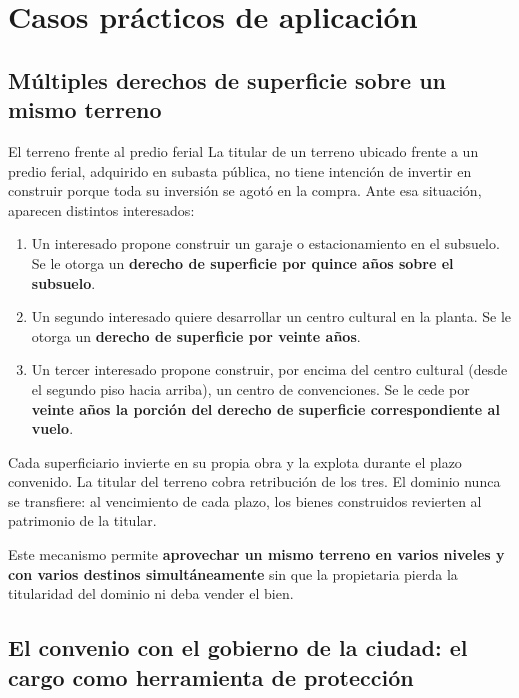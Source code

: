 \documentclass[12pt,oneside]{book}
\begin{document}
\chapter{Casos prácticos de aplicación}

\section{Múltiples derechos de superficie sobre un mismo terreno}

\begin{example}{El terreno frente al predio ferial}
La titular de un terreno ubicado frente a un predio ferial, adquirido en subasta pública, no tiene intención de invertir en construir porque toda su inversión se agotó en la compra. Ante esa situación, aparecen distintos interesados:

\begin{enumerate}
    \item Un interesado propone construir un garaje o estacionamiento en el subsuelo. Se le otorga un \textbf{derecho de superficie por quince años sobre el subsuelo}.
    \item Un segundo interesado quiere desarrollar un centro cultural en la planta. Se le otorga un \textbf{derecho de superficie por veinte años}.
    \item Un tercer interesado propone construir, por encima del centro cultural (desde el segundo piso hacia arriba), un centro de convenciones. Se le cede por \textbf{veinte años la porción del derecho de superficie correspondiente al vuelo}.
\end{enumerate}

Cada superficiario invierte en su propia obra y la explota durante el plazo convenido. La titular del terreno cobra retribución de los tres. El dominio nunca se transfiere: al vencimiento de cada plazo, los bienes construidos revierten al patrimonio de la titular.
\end{example}

Este mecanismo permite \textbf{aprovechar un mismo terreno en varios niveles y con varios destinos simultáneamente} sin que la propietaria pierda la titularidad del dominio ni deba vender el bien.

\section{El convenio con el gobierno de la ciudad: el cargo como herramienta de protección}
\end{document}
